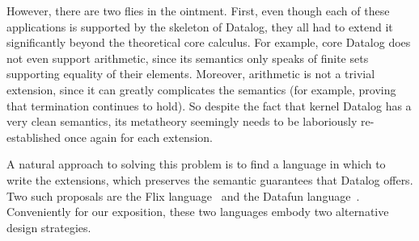 
However, there are two flies in the ointment. First, even though each
of these applications is supported by the skeleton of Datalog, they
all had to extend it significantly beyond the theoretical core
calculus.  For example, core Datalog does not even support arithmetic,
since its semantics only speaks of finite sets supporting equality of
their elements. Moreover, arithmetic is not a trivial extension, since
it can greatly complicates the semantics (for example, proving that
termination continues to hold). So despite the fact that kernel
Datalog has a very clean semantics, its metatheory seemingly needs to
be laboriously re-established once again for each extension.

A natural approach to solving this problem is to find a language in
which to write the extensions, which preserves the semantic guarantees
that Datalog offers. Two such proposals are the Flix
language~\cite{flix} and the Datafun language~\cite{datafun}. 
Conveniently for our exposition, these two languages embody two
alternative design strategies.

